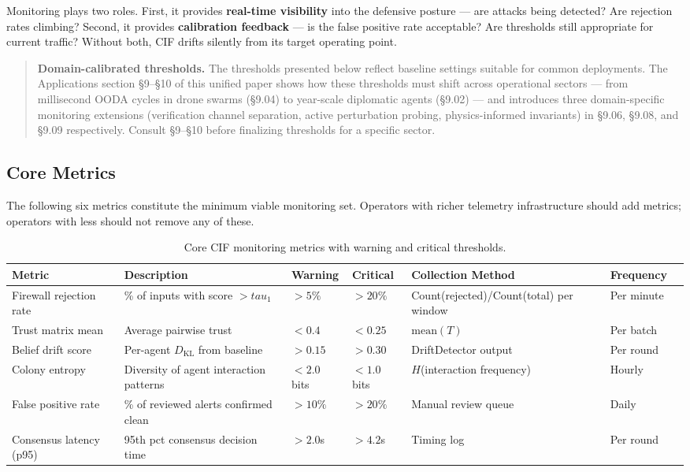 \documentclass[
]{article}
\begin{document}
Monitoring plays two roles. First, it provides \textbf{real-time
visibility} into the defensive posture --- are attacks being detected?
Are rejection rates climbing? Second, it provides \textbf{calibration
feedback} --- is the false positive rate acceptable? Are thresholds
still appropriate for current traffic? Without both, CIF drifts silently
from its target operating point.

\begin{quote}
\textbf{Domain-calibrated thresholds.} The thresholds presented below
reflect baseline settings suitable for common deployments. The
Applications section §9--§10 of this unified paper shows how these
thresholds must shift across operational sectors --- from millisecond
OODA cycles in drone swarms (§9.04) to year-scale diplomatic agents
(§9.02) --- and introduces three domain-specific monitoring extensions
(verification channel separation, active perturbation probing,
physics-informed invariants) in §9.06, §9.08, and §9.09 respectively.
Consult §9--§10 before finalizing thresholds for a specific sector.
\end{quote}

\subsection{Core Metrics}\label{core-metrics}

The following six metrics constitute the minimum viable monitoring set.
Operators with richer telemetry infrastructure should add metrics;
operators with less should not remove any of these.

\begin{table}[htbp]
\centering
\caption{Core CIF monitoring metrics with warning and critical thresholds.}
\label{tab:core-metrics}
\begin{tabular}{@{}p{2.5cm}p{2.8cm}lllp{2cm}p{1.6cm}@{}}
\toprule
Metric & Description & Warning & Critical & Collection Method & Frequency \\
\midrule
Firewall rejection rate & \% of inputs with score $> tau_1$ & $>5\%$ & $>20\%$ & Count(rejected)/Count(total) per window & Per minute \\
Trust matrix mean & Average pairwise trust & $<0.4$ & $<0.25$ & $\mathrm{mean}(T)$ & Per batch \\
Belief drift score & Per-agent $D_{\mathrm{KL}}$ from baseline & $>0.15$ & $>0.30$ & DriftDetector output & Per round \\
Colony entropy & Diversity of agent interaction patterns & $<2.0$ bits & $<1.0$ bits & $H$(interaction frequency) & Hourly \\
False positive rate & \% of reviewed alerts confirmed clean & $>10\%$ & $>20\%$ & Manual review queue & Daily \\
Consensus latency (p95) & 95th pct consensus decision time & $>2.0$s & $>4.2$s & Timing log & Per round \\
\bottomrule
\end{tabular}
\end{table}
\end{document}
